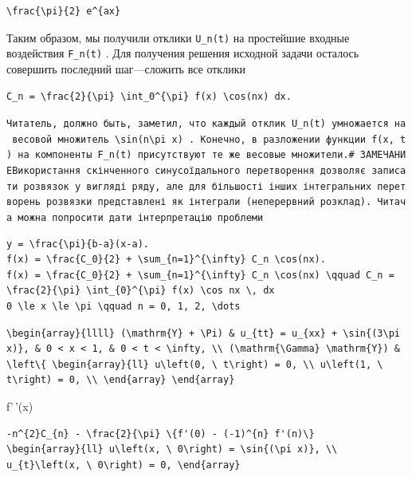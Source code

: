 \documentclass[
  ukrainian,
]{article}
\begin{document}
\begin{verbatim}
\frac{\pi}{2} e^{ax}
\end{verbatim}

Таким образом, мы получили отклики \texttt{U\_n(t)} на простейшие
входные воздействия \texttt{F\_n(t)} . Для получения решения исходной
задачи осталось совершить последний шаг---сложить все отклики

\begin{verbatim}
C_n = \frac{2}{\pi} \int_0^{\pi} f(x) \cos(nx) dx.
\end{verbatim}

\texttt{Читатель,\ должно\ быть,\ заметил,\ что\ каждый\ отклик\ \textquotesingle{}U\_n(t)\textquotesingle{}\ умножается\ на\ весовой\ множитель\ \textquotesingle{}\textbackslash{}sin(n\textbackslash{}pi\ x)\textquotesingle{}\ .\ Конечно,\ в\ разложении\ функции\ \textquotesingle{}f(x,\ t)\textquotesingle{}\ на\ компоненты\ \textquotesingle{}F\_n(t)\textquotesingle{}\ присутствуют\ те\ же\ весовые\ множители.\#\ ЗАМЕЧАНИЕВикористання\ скінченного\ синусоїдального\ перетворення\ дозволяє\ записати\ розв\textquotesingle{}язок\ у\ вигляді\ ряду,\ але\ для\ більшості\ інших\ інтегральних\ перетворень\ розв\textquotesingle{}язки\ представлені\ як\ інтеграли\ (неперервний\ розклад).\ Читача\ можна\ попросити\ дати\ інтерпретацію\ проблеми}

\begin{verbatim}
y = \frac{\pi}{b-a}(x-a).
f(x) = \frac{C_0}{2} + \sum_{n=1}^{\infty} C_n \cos(nx).
f(x) = \frac{C_0}{2} + \sum_{n=1}^{\infty} C_n \cos(nx) \qquad C_n = \frac{2}{\pi} \int_{0}^{\pi} f(x) \cos nx \, dx
0 \le x \le \pi \qquad n = 0, 1, 2, \dots
\end{verbatim}

\begin{verbatim}
\begin{array}{llll} (\mathrm{Y} + \Pi) & u_{tt} = u_{xx} + \sin{(3\pi x)}, & 0 < x < 1, & 0 < t < \infty, \\ (\mathrm{\Gamma} \mathrm{Y}) & \left\{ \begin{array}{ll} u\left(0, \ t\right) = 0, \\ u\left(1, \ t\right) = 0, \\ \end{array} \end{array}
\end{verbatim}

f'\,'(x)

\begin{verbatim}
-n^{2}C_{n} - \frac{2}{\pi} \{f'(0) - (-1)^{n} f'(n)\}
\begin{array}{ll} u\left(x, \ 0\right) = \sin{(\pi x)}, \\ u_{t}\left(x, \ 0\right) = 0, \end{array}
\end{verbatim}
\end{document}
